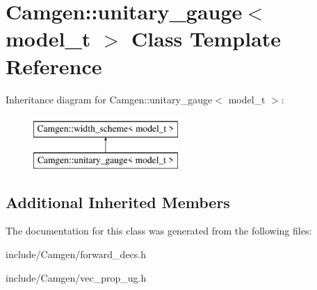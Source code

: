 \hypertarget{a00554}{\section{Camgen\-:\-:unitary\-\_\-gauge$<$ model\-\_\-t $>$ Class Template Reference}
\label{a00554}
}
Inheritance diagram for Camgen\-:\-:unitary\-\_\-gauge$<$ model\-\_\-t $>$\-:\begin{figure}[H]
\begin{center}
\leavevmode
\includegraphics[height=2.000000cm]{a00554}
\end{center}
\end{figure}
\subsection*{Additional Inherited Members}


The documentation for this class was generated from the following files\-:\begin{DoxyCompactItemize}
\item 
include/\-Camgen/forward\-\_\-decs.\-h\item 
include/\-Camgen/vec\-\_\-prop\-\_\-ug.\-h\end{DoxyCompactItemize}
